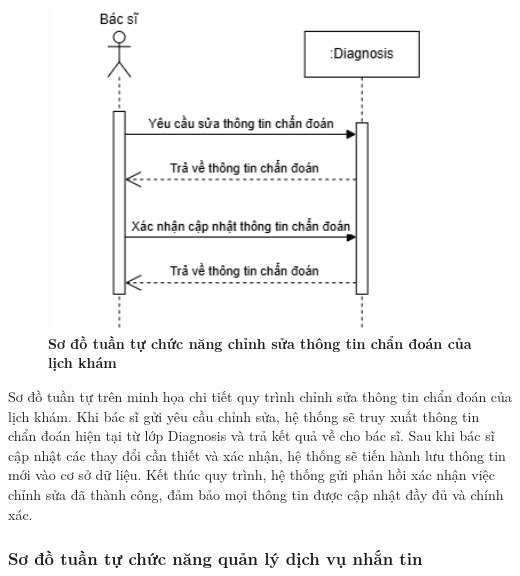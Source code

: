 \begin{figure}[H]
	\centering
	\includegraphics[width=10cm,height=8.5cm]{Images/sequence/diagnosis/update.drawio.png}
	\caption[Sơ đồ tuần tự chức năng chỉnh sửa thông tin chẩn đoán của lịch khám]{\bfseries \fontsize{12pt}{0pt}
		\selectfont Sơ đồ tuần tự chức năng chỉnh sửa thông tin chẩn đoán của lịch khám}
	\label{sequence_update} %
\end{figure}
Sơ đồ tuần tự trên minh họa chi tiết quy trình chỉnh sửa thông tin chẩn đoán của lịch khám. Khi bác sĩ gửi yêu cầu chỉnh sửa, hệ thống sẽ truy xuất thông tin chẩn đoán hiện tại từ lớp Diagnosis và trả kết quả về cho bác sĩ.
Sau khi bác sĩ cập nhật các thay đổi cần thiết và xác nhận, hệ thống sẽ tiến hành lưu thông tin mới vào cơ sở dữ liệu. Kết thúc quy trình, hệ thống gửi phản hồi xác nhận việc chỉnh sửa đã thành công, đảm bảo mọi thông tin được cập nhật đầy đủ và chính xác.

\subsubsection{Sơ đồ tuần tự chức năng quản lý dịch vụ nhắn tin}

